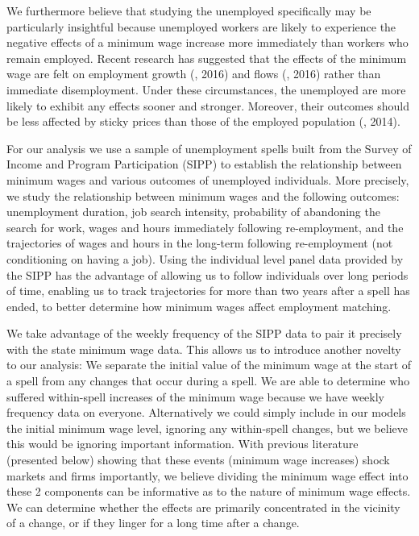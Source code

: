 \documentclass{article}
\begin{document}
We furthermore believe that studying the unemployed specifically may be particularly insightful because unemployed workers are likely to experience the negative effects of a minimum wage increase more immediately than workers who remain employed. Recent research has suggested that the effects of the minimum wage are felt on employment growth (\citeauthor{meer2016effects}, 2016) and flows (\citeauthor{dube2016minimum}, 2016) rather than immediate disemployment. Under these circumstances, the unemployed are more likely to exhibit any effects sooner and stronger. Moreover, their outcomes should be less affected by sticky prices than those of the employed population (\citeauthor{barattieri2014some}, 2014). 

For our analysis we use a sample of unemployment spells built from the Survey of Income and Program Participation (SIPP) to establish the relationship between minimum wages and various outcomes of unemployed individuals. More precisely, we study the relationship between minimum wages and the following outcomes: unemployment duration, job search intensity, probability of abandoning the search for work, wages and hours immediately following re-employment, and the trajectories of wages and hours in the long-term following re-employment (not conditioning on having a job). Using the individual level panel data provided by the SIPP has the advantage of allowing us to follow individuals over long periods of time, enabling us to track trajectories for more than two years after a spell has ended, to better determine how minimum wages affect employment matching. 

We take advantage of the weekly frequency of the SIPP data to pair it precisely with the state minimum wage data. This allows us to introduce another novelty to our analysis: We separate the initial value of the minimum wage at the start of a spell from any changes that occur during a spell. We are able to determine who suffered within-spell increases of the minimum wage because we have weekly frequency data on everyone. Alternatively we could simply include in our models the initial minimum wage level, ignoring any within-spell changes, but we believe this would be ignoring important information. With previous literature (presented below) showing that these events (minimum wage increases) shock markets and firms importantly, we believe dividing the minimum wage effect into these 2 components can be informative as to the nature of minimum wage effects. We can determine whether the effects are primarily concentrated in the vicinity of a change, or if they linger for a long time after a change. 
\end{document}
